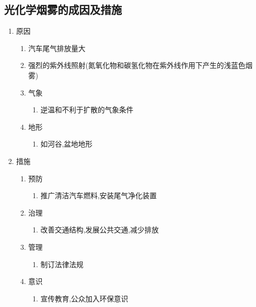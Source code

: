\documentclass[a4paper]{article}
\begin{document}
    \subsection{光化学烟雾的成因及措施}
    \begin{enumerate}
        \item 原因
        \begin{enumerate}
            \item 汽车尾气排放量大
            \item 强烈的紫外线照射(氮氧化物和碳氢化物在紫外线作用下产生的浅蓝色烟雾)
            \item 气象
            \begin{enumerate}
                \item 逆温和不利于扩散的气象条件
            \end{enumerate}
            \item 地形
            \begin{enumerate}
                \item 如河谷,盆地地形
            \end{enumerate}
        \end{enumerate}
        \item 措施
        \begin{enumerate}
            \item 预防
            \begin{enumerate}
                \item 推广清洁汽车燃料,安装尾气净化装置
            \end{enumerate}
            \item 治理
            \begin{enumerate}
                \item 改善交通结构,发展公共交通,减少排放
            \end{enumerate}
            \item 管理
            \begin{enumerate}
                \item 制订法律法规
            \end{enumerate}
            \item 意识
            \begin{enumerate}
                \item 宣传教育,公众加入环保意识 %
            \end{enumerate}
        \end{enumerate}
    \end{enumerate}
\end{document}

